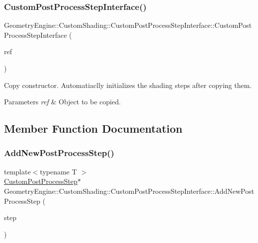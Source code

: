 \subsubsection{\texorpdfstring{CustomPostProcessStepInterface()}{CustomPostProcessStepInterface()}}
{\footnotesize\ttfamily Geometry\+Engine\+::\+Custom\+Shading\+::\+Custom\+Post\+Process\+Step\+Interface\+::\+Custom\+Post\+Process\+Step\+Interface (\begin{DoxyParamCaption}\item[{const \mbox{\hyperlink{class_geometry_engine_1_1_custom_shading_1_1_custom_post_process_step_interface}{Custom\+Post\+Process\+Step\+Interface}} \&}]{ref }\end{DoxyParamCaption})}

Copy constructor. Automatiaclly initializes the shading steps after copying them. 
\begin{DoxyParams}{Parameters}
{\em ref} & Object to be copied. \\
\hline
\end{DoxyParams}


\subsection{Member Function Documentation}
\mbox{\label{class_geometry_engine_1_1_custom_shading_1_1_custom_post_process_step_interface_ad32dfc1e22d7daebc55a8e070970b1b8}} 
\subsubsection{\texorpdfstring{AddNewPostProcessStep()}{AddNewPostProcessStep()}}
{\footnotesize\ttfamily template$<$typename T $>$ \\
\mbox{\hyperlink{class_geometry_engine_1_1_custom_shading_1_1_custom_post_process_step}{Custom\+Post\+Process\+Step}}$\ast$ Geometry\+Engine\+::\+Custom\+Shading\+::\+Custom\+Post\+Process\+Step\+Interface\+::\+Add\+New\+Post\+Process\+Step (\begin{DoxyParamCaption}\item[{\mbox{\hyperlink{namespace_geometry_engine_1_1_custom_shading_a09e44ca81de5fe08c6d50271d680c4b1}{Custom\+Post\+Process\+Steps}}}]{step }\end{DoxyParamCaption})\hspace{0.3cm}{\ttfamily [inline]}}

